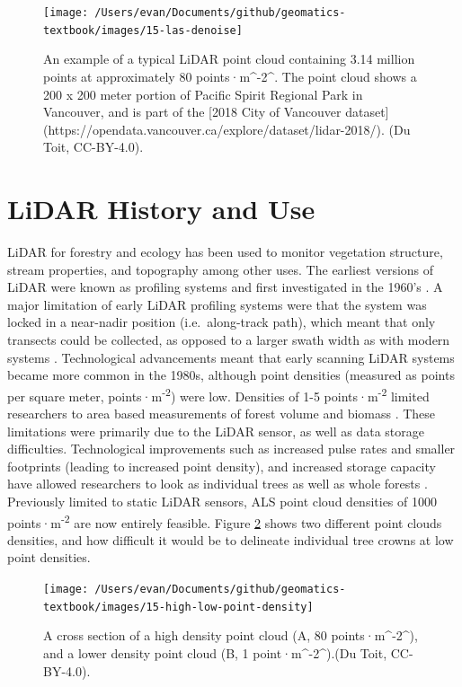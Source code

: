 \documentclass[
]{book}
\begin{document}
\begin{figure}
\texttt{[image: /Users/evan/Documents/github/geomatics-textbook/images/15-las-denoise]} \caption{An example of a typical LiDAR point cloud containing 3.14 million points at approximately 80 points·m^-2^. The point cloud shows a 200 x 200 meter portion of Pacific Spirit Regional Park in Vancouver, and is part of the [2018 City of Vancouver dataset] (https://opendata.vancouver.ca/explore/dataset/lidar-2018/). (Du Toit, CC-BY-4.0).}\label{fig:15-las-denoise}
\end{figure}

\hypertarget{lidar-history-and-use}{%
\section{LiDAR History and Use}\label{lidar-history-and-use}}

LiDAR for forestry and ecology has been used to monitor vegetation structure, stream properties, and topography among other uses. The earliest versions of LiDAR were known as profiling systems and first investigated in the 1960's \citep{Nelson2013}. A major limitation of early LiDAR profiling systems were that the system was locked in a near-nadir position (i.e.~along-track path), which meant that only transects could be collected, as opposed to a larger swath width as with modern systems \citep{Nelson2013, Lim2003}. Technological advancements meant that early scanning LiDAR systems became more common in the 1980s, although point densities (measured as points per square meter, points·m\textsuperscript{-2}) were low. Densities of 1-5 points·m\textsuperscript{-2} limited researchers to area based measurements of forest volume and biomass \citep{Nelson2013}. These limitations were primarily due to the LiDAR sensor, as well as data storage difficulties. Technological improvements such as increased pulse rates and smaller footprints (leading to increased point density), and increased storage capacity have allowed researchers to look as individual trees as well as whole forests \citep{Jakubowski2013}. Previously limited to static LiDAR sensors, ALS point cloud densities of 1000 points·m\textsuperscript{-2} are now entirely feasible. Figure \ref{fig:15-high-low-point-density} shows two different point clouds densities, and how difficult it would be to delineate individual tree crowns at low point densities.

\begin{figure}
\texttt{[image: /Users/evan/Documents/github/geomatics-textbook/images/15-high-low-point-density]} \caption{A cross section of a high density point cloud (A, 80 points·m^-2^), and a lower density point cloud (B, 1 point·m^-2^).(Du Toit, CC-BY-4.0).}\label{fig:15-high-low-point-density}
\end{figure}
\end{document}
